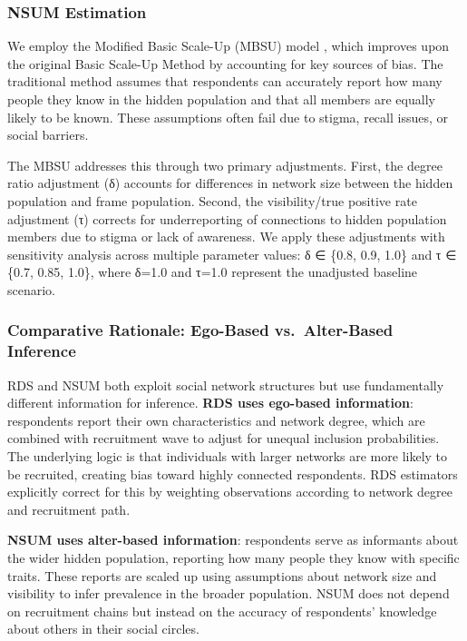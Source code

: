 \documentclass[
  12pt,
  letterpaper,
  DIV=11,
  numbers=noendperiod]{scrartcl}
\theoremstyle{plain}
\theoremstyle{definition}
\begin{document}
\subsubsection{NSUM Estimation}\label{nsum-estimation}

We employ the Modified Basic Scale-Up (MBSU) model
\autocite{feeh16-generalizing}, which improves upon the original Basic
Scale-Up Method by accounting for key sources of bias. The traditional
method assumes that respondents can accurately report how many people
they know in the hidden population and that all members are equally
likely to be known. These assumptions often fail due to stigma, recall
issues, or social barriers.

The MBSU addresses this through two primary adjustments. First, the
degree ratio adjustment (δ) accounts for differences in network size
between the hidden population and frame population. Second, the
visibility/true positive rate adjustment (τ) corrects for underreporting
of connections to hidden population members due to stigma or lack of
awareness. We apply these adjustments with sensitivity analysis across
multiple parameter values: δ ∈ \{0.8, 0.9, 1.0\} and τ ∈ \{0.7, 0.85,
1.0\}, where δ=1.0 and τ=1.0 represent the unadjusted baseline scenario.

\subsubsection{Comparative Rationale: Ego-Based vs.~Alter-Based
Inference}\label{comparative-rationale-ego-based-vs.-alter-based-inference}

RDS and NSUM both exploit social network structures but use
fundamentally different information for inference. \textbf{RDS uses
ego-based information}: respondents report their own characteristics and
network degree, which are combined with recruitment wave to adjust for
unequal inclusion probabilities. The underlying logic is that
individuals with larger networks are more likely to be recruited,
creating bias toward highly connected respondents. RDS estimators
explicitly correct for this by weighting observations according to
network degree and recruitment path.

\textbf{NSUM uses alter-based information}: respondents serve as
informants about the wider hidden population, reporting how many people
they know with specific traits. These reports are scaled up using
assumptions about network size and visibility to infer prevalence in the
broader population. NSUM does not depend on recruitment chains but
instead on the accuracy of respondents' knowledge about others in their
social circles.
\end{document}
